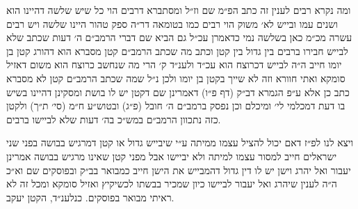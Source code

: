\documentclass[12pt, openany]{book}
\begin{document}
\begin{multicols}{2}
ומה נקרא רבים לענין זה כתב הפ״מ שם וז״ל ומסתברא דרבים הוי כל שיש שלשה דהיינו הוא ושנים עמו ובייש לא׳ משוק הוי רבים כמו בטומאה דר״ה ספק טהור היינו שלשה ויש רבים עשרה מכ״מ כאן בשלשה נמי כדאמרן עכ״ל גם הביא שם דברי הרמב״ם ה׳ דעות שכתב שלא לבייש חבירו ברבים בין גדול בין קטן וכתב מה שכתב הרמב״ם קטן מסברא הוא דהורג קטן בן יומו חייב ה״ה לבייש דכרוצח הוא עכ״ד ולענ״ד ק׳ הרי מה שנחשב כרוצח הוא משום דאזיל סומקא ואתי חוורא וזה לא שייך בקטן בן יומו ולכן נ״ל שמה שכתב הרמב״ם קטן לא מסברא כתב כן אלא ע״פ הגמרא דב״ק (דף פ״ו) דאמרינן שם דקטן יש לו בושת ומסקינן דהיינו בשיש בו דעת דמכלמי לי׳ ומיכלם וכן נפסק ברמב״ם ה׳ חובל (פ״ג) ובטוש״ע ח״מ (סי׳ ת״ך) ולקטן כזה נתכוון הרמב״ם במש״כ בה׳ דעות שלא לביישו ברבים.\\\vspace{0pt}

ויצא לנו לפ״ז דאם יכול להציל עצמו ממיתה ע״י שיבייש גדול או קטן דמרגיש בבושה בפני שני ישראלים חייב למסור עצמו למיתה ולא יביישו אבל מפני קטן שאינו מרגיש בבושה אמרינן יעבור ואל יהרג וישן יש לו דין גדול דהמבייש את הישן חייב כמבואר בב״ק ובפוסקים שם וא״כ ה״ה לענין שיהרג ואל יעבור לביישו כיון שמכיר בבשתו לכשיקיץ ואזיל סומקא ומכל זה לא ראיתי מבואר בפוסקים. כנלענ״ד, הקטן יעקב.\\\vspace{0pt}

\end{multicols}\newpage
\end{document}
